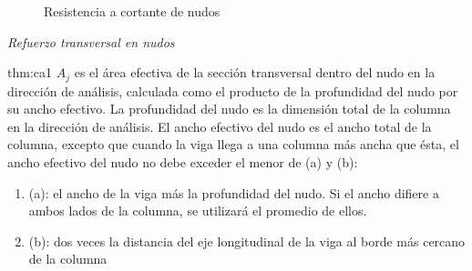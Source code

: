 \begin{figure}[ht!]
    \centering
    \hspace{10mm}
    \caption{Resistencia a cortante de nudos}
    \label{reqn}
\end{figure}
\textit{Refuerzo transversal en nudos}
\begin{theo}{thm:ca1}
$A_{j}$ es el área efectiva de la sección transversal dentro del nudo en la dirección de análisis, calculada  como  el  producto  de  la  profundidad  del  nudo  por su  ancho  efectivo. La profundidad del nudo es la dimensión total de la columna en la dirección de análisis. El ancho efectivo del nudo es el ancho total de la columna, excepto que cuando la viga llega a una columna más ancha que ésta, el ancho efectivo del nudo no debe exceder el menor de (a) y (b):
\begin{enumerate}
\item[] (a): el ancho de la viga más la profundidad del nudo.  Si el ancho difiere a ambos lados de la columna, se utilizará el promedio de ellos.
\item[] (b): dos veces la distancia del eje longitudinal de la viga al borde más cercano de la columna
\end{enumerate}
\end{theo}
